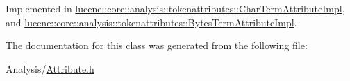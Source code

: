 Implemented in \mbox{\hyperlink{classlucene_1_1core_1_1analysis_1_1tokenattributes_1_1CharTermAttributeImpl_aefef8491e2a12493480fe19dd6d61ca7}{lucene\+::core\+::analysis\+::tokenattributes\+::\+Char\+Term\+Attribute\+Impl}}, and \mbox{\hyperlink{classlucene_1_1core_1_1analysis_1_1tokenattributes_1_1BytesTermAttributeImpl_ab0c78ee232b1546b553118afc0117374}{lucene\+::core\+::analysis\+::tokenattributes\+::\+Bytes\+Term\+Attribute\+Impl}}.



The documentation for this class was generated from the following file\+:\begin{DoxyCompactItemize}
\item 
Analysis/\mbox{\hyperlink{Analysis_2Attribute_8h}{Attribute.\+h}}\end{DoxyCompactItemize}
